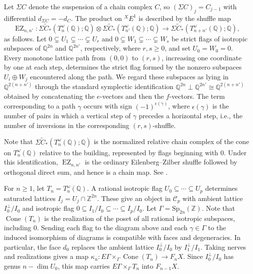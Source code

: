 \documentclass[12 pt]{amsart}
\newcommand{\QQ}{\mathbb{Q}}
\newcommand{\ZZ}{\mathbb{Z}}
\newcommand{\cC}{\mathcal{C}}
\newcommand{\EX}{{}^{X}\!E}
\newcommand{\Sp}{\mathrm{Sp}}
\newcommand{\Cone}{\operatorname{Cone}}
\newcommand{\<}{\langle}
\renewcommand{\>}{\rangle}
\theoremstyle{definition}
\begin{document}
Let $\Sigma C$ denote the suspension of a chain complex $C$, so $(\Sigma C)_j = C_{j - 1}$ with differential $d_{\Sigma C} = -d_C$. The product on $\EX^1$ is described by the shuffle map
\[
\operatorname{EZ}_{n, n'} \colon \Sigma \widetilde C_*(T^\omega_n(\QQ); \QQ) \otimes \Sigma \widetilde C_*(T^\omega_{n'}(\QQ); \QQ) \longrightarrow \Sigma \widetilde C_*(T^\omega_{n + n'}(\QQ); \QQ),
\]
as follows. Let $0 \subsetneq U_1 \subsetneq \cdots \subsetneq U_r$ and $0 \subsetneq W_1 \subsetneq \cdots \subsetneq W_s$ be strict flags of isotropic subspaces of $\QQ^{2n}$ and $\QQ^{2n'}$, respectively, where $r, s \geq 0$, and set $U_0 = W_0 = 0$. Every monotone lattice path from $(0, 0)$ to $(r, s)$, increasing one coordinate by one at each step, determines the strict flag formed by the nonzero subspaces $U_i \oplus W_j$ encountered along the path. We regard these subspaces as lying in $\QQ^{2(n + n')}$ through the standard symplectic identification $\QQ^{2n} \perp \QQ^{2n'} \cong \QQ^{2(n + n')}$ obtained by concatenating the $e$-vectors and then the $f$-vectors. The term corresponding to a path $\gamma$ occurs with sign $(-1)^{\epsilon(\gamma)}$, where $\epsilon(\gamma)$ is the number of pairs in which a vertical step of $\gamma$ precedes a horizontal step, i.e., the number of inversions in the corresponding $(r, s)$-shuffle.

Note that $\Sigma \widetilde C_*(T_n^\omega(\QQ); \QQ)$ is the normalized relative chain complex of the cone on $T_n^\omega(\QQ)$ relative to the building, represented by flags beginning with $0$. Under this identification, $\operatorname{EZ}_{n, n'}$ is the ordinary Eilenberg--Zilber shuffle followed by orthogonal direct sum, and hence is a chain map. See \cite[\S8.5]{Weibel}.

For $n \geq 1$, let $T_n = T_n^\omega(\QQ)$. A rational isotropic flag $U_0 \subseteq \cdots \subseteq U_p$ determines saturated lattices $I_j = U_j \cap \ZZ^{2n}$. These give an object in $\cC_p$ with ambient lattice $I_0^\perp/I_0$ and isotropic flag $0 \subseteq I_1/I_0 \subseteq \cdots \subseteq I_p/I_0$. Let $\Gamma = \Sp_{2n}(\ZZ)$. Note that $\Cone(T_n)$ is the realization of the poset of all rational isotropic subspaces, including $0$. Sending each flag to the diagram above and each $\gamma \in \Gamma$ to the induced isomorphism of diagrams is compatible with faces and degeneracies. In particular, the face $d_0$ replaces the ambient lattice $I_0^\perp/I_0$ by $I_1^\perp/I_1$. Taking nerves and realizations gives a map $\kappa_n \colon E \Gamma \times_\Gamma \Cone(T_n) \to F_n X$. Since $I_0^\perp/I_0$ has genus $n - \dim U_0$, this map carries $E \Gamma \times_\Gamma T_n$ into $F_{n - 1} X$.
\end{document}
